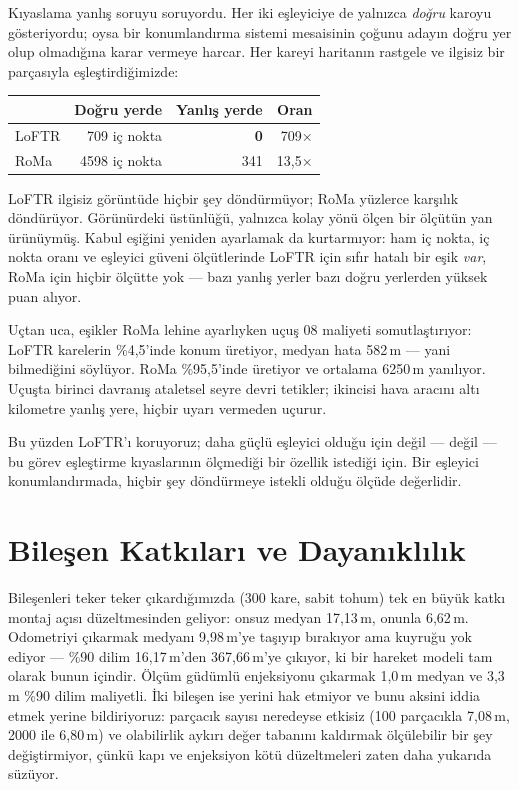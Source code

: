 \documentclass[conference]{IEEEtran}
\begin{document}
Kıyaslama yanlış soruyu soruyordu. Her iki eşleyiciye de yalnızca \emph{doğru}
karoyu gösteriyordu; oysa bir konumlandırma sistemi mesaisinin çoğunu adayın
doğru yer olup olmadığına karar vermeye harcar. Her kareyi haritanın rastgele
ve ilgisiz bir parçasıyla eşleştirdiğimizde:

\begin{center}
\small
\begin{tabular}{lrrr}
\toprule
& Doğru yerde & Yanlış yerde & Oran \\
\midrule
LoFTR & 709 iç nokta & \textbf{0} & 709$\times$ \\
RoMa  & 4598 iç nokta & 341 & 13,5$\times$ \\
\bottomrule
\end{tabular}
\end{center}

LoFTR ilgisiz görüntüde hiçbir şey döndürmüyor; RoMa yüzlerce karşılık
döndürüyor. Görünürdeki üstünlüğü, yalnızca kolay yönü ölçen bir ölçütün yan
ürünüymüş. Kabul eşiğini yeniden ayarlamak da kurtarmıyor: ham iç nokta, iç
nokta oranı ve eşleyici güveni ölçütlerinde LoFTR için sıfır hatalı bir eşik
\emph{var}, RoMa için hiçbir ölçütte yok --- bazı yanlış yerler bazı doğru
yerlerden yüksek puan alıyor.

Uçtan uca, eşikler RoMa lehine ayarlıyken uçuş 08 maliyeti somutlaştırıyor:
LoFTR karelerin \%4,5'inde konum üretiyor, medyan hata 582\,m --- yani
bilmediğini söylüyor. RoMa \%95,5'inde üretiyor ve ortalama 6250\,m yanılıyor.
Uçuşta birinci davranış ataletsel seyre devri tetikler; ikincisi hava aracını
altı kilometre yanlış yere, hiçbir uyarı vermeden uçurur.

Bu yüzden LoFTR'ı koruyoruz; daha güçlü eşleyici olduğu için değil --- değil
--- bu görev eşleştirme kıyaslarının ölçmediği bir özellik istediği için. Bir
eşleyici konumlandırmada, hiçbir şey döndürmeye istekli olduğu ölçüde
değerlidir.

\section{Bileşen Katkıları ve Dayanıklılık}

Bileşenleri teker teker çıkardığımızda (300 kare, sabit tohum) tek en büyük
katkı montaj açısı düzeltmesinden geliyor: onsuz medyan 17,13\,m, onunla
6,62\,m. Odometriyi çıkarmak medyanı 9,98\,m'ye taşıyıp bırakıyor ama kuyruğu
yok ediyor --- \%90 dilim 16,17\,m'den 367,66\,m'ye çıkıyor, ki bir hareket
modeli tam olarak bunun içindir. Ölçüm güdümlü enjeksiyonu çıkarmak 1,0\,m
medyan ve 3,3\,m \%90 dilim maliyetli. İki bileşen ise yerini hak etmiyor ve
bunu aksini iddia etmek yerine bildiriyoruz: parçacık sayısı neredeyse etkisiz
(100 parçacıkla 7,08\,m, 2000 ile 6,80\,m) ve olabilirlik aykırı değer tabanını
kaldırmak ölçülebilir bir şey değiştirmiyor, çünkü kapı ve enjeksiyon kötü
düzeltmeleri zaten daha yukarıda süzüyor.
\end{document}

